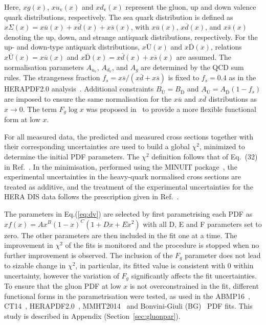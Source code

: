 \documentclass[12pt]{article}
\begin{document}
Here, $xg(x)$, $xu_{\mathrm{v}}(x)$ and $xd_{\mathrm{v}}(x)$ represent the gluon, up and down valence quark distributions, respectively. The sea quark distribution is defined as $x\Sigma(x)=x\overline{u}(x)+x\overline{d}(x)+x\overline{s}(x)$, with $x\overline{u}(x)$, $x\overline{d}(x)$, and $x\overline{s}(x)$ denoting the up, down, and strange antiquark distributions, respectively.
For the up- and down-type antiquark distributions, $x\overline{\mathrm{U}}(x)$ and $x\overline{\mathrm{D}}(x)$, relations $x\overline{\mathrm{U}}(x) = x\overline{u}(x)$ and $x\overline{\mathrm{D}}(x) = x\overline{d}(x) + x\overline{s}(x)$  are assumed.
The normalisation parameters $A_{u_{\mathrm{v}}}$, $A_{d_\mathrm{v}}$, and $A_{g}$ are determined by the QCD sum rules.
The strangeness fraction $f_{s} = x\overline{s}/( x\overline{d} + x\overline{s})$ is fixed to
$f_{s}=0.4$ as in the HERAPDF2.0 analysis~\cite{Abramowicz:2015mha}.
Additional constraints $B_{\overline{\mathrm{U}}} = B_{\overline{\mathrm{D}}}$ and $A_{\overline{\mathrm{U}}} = A_{\overline{\mathrm{D}}}(1 - f_{s})$ are imposed to ensure the same normalisation for the $x\overline{u}$ and $x\overline{d}$ distributions as $x \to 0$.
The term $F_g\log x$ was proposed in~\cite{Bonvini:2019wxf} to provide a more flexible functional form at low $x$.

For all measured data, the predicted and measured cross sections together with their corresponding uncertainties are used to build a global $\chi^2$, minimized to determine the initial PDF
parameters. The $\chi^2$ definition follows that of Eq.~(32) in Ref.~\cite{Abramowicz:2015mha}. In the minimisation, performed 
using the MINUIT package~\cite{James:1975dr}, the experimental uncertainties in the heavy-quark normalised cross 
sections are treated as additive, and the treatment of the experimental uncertainties for the HERA DIS data follows 
the prescription given in Ref.~\cite{Abramowicz:2015mha}.

The parameters in Eq.(\ref{eq:dv}) are selected by first parametrising each PDF as $xf(x) = Ax^B(1-x)^C(1+Dx+Ex^2)$ with all D, E and F parameters set to zero. The other 
parameters are then included in the fit one at a time. The improvement in $\chi^2$ of the fits is monitored and the 
procedure is stopped when no further improvement is observed. The inclusion of the $F_{g}$ parameter does not lead to sizable change in $\chi^2$, in particular, its fitted value is consistent with $0$ within uncertainty, however the variation of $F_{g}$ significantly affects the fit uncertainties.
To ensure that the gluon PDF at low $x$ is not overconstrained in the fit, different functional forms in the parametrisation were tested, as used in the ABMP16~\cite{Alekhin:2017kpj}, CT14~\cite{Dulat:2015mca}, HERAPDF2.0~\cite{Abramowicz:2015mha}, MMHT2014~\cite{Harland-Lang:2014zoa} and Bonvini-Giuli (BG)~\cite{Bonvini:2019wxf} PDF fits. This study is described in Appendix (Section~\ref{sec:gluonpar}).
\end{document}
